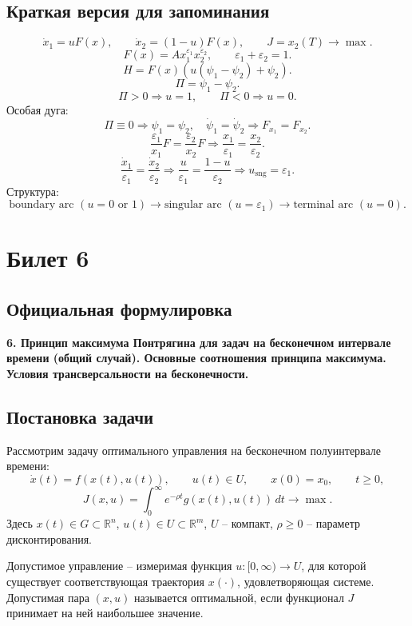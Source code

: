 \documentclass[12pt,a4paper]{article}
\newcommand{\R}{\mathbb{R}}
\newcommand{\eps}{\varepsilon}
\newcommand{\sng}{\mathrm{sng}}
\begin{document}
\subsection{Краткая версия для запоминания}

\[
    \dot x_1=uF(x),
    \qquad
    \dot x_2=(1-u)F(x),
    \qquad
    J=x_2(T)\to\max.
\]
\[
    F(x)=Ax_1^{\eps_1}x_2^{\eps_2},
    \qquad
    \eps_1+\eps_2=1.
\]
\[
    H=F(x)(u(\psi_1-\psi_2)+\psi_2).
\]
\[
    \Pi=\psi_1-\psi_2.
\]
\[
    \Pi>0\Rightarrow u=1,
    \qquad
    \Pi<0\Rightarrow u=0.
\]
Особая дуга:
\[
    \Pi\equiv0\Rightarrow \psi_1=\psi_2,
    \quad
    \dot\psi_1=\dot\psi_2
    \Rightarrow
    F_{x_1}=F_{x_2}.
\]
\[
    \frac{\eps_1}{x_1}F=\frac{\eps_2}{x_2}F
    \Rightarrow
    \frac{x_1}{\eps_1}=\frac{x_2}{\eps_2}.
\]
\[
    \frac{\dot x_1}{\eps_1}=\frac{\dot x_2}{\eps_2}
    \Rightarrow
    \frac{u}{\eps_1}=\frac{1-u}{\eps_2}
    \Rightarrow
    u_{\sng}=\eps_1.
\]
Структура:
\[
    \text{boundary arc }(u=0\text{ or }1)
    \to
    \text{singular arc }(u=\eps_1)
    \to
    \text{terminal arc }(u=0).
\]

\newpage

\section{Билет 6}

\subsection*{Официальная формулировка}

\textbf{6. Принцип максимума Понтрягина для задач на бесконечном интервале времени (общий случай). Основные соотношения принципа максимума. Условия трансверсальности на бесконечности.}

\subsection{Постановка задачи}

Рассмотрим задачу оптимального управления на бесконечном полуинтервале времени:
\[
    \dot x(t)=f(x(t),u(t)),
    \qquad
    u(t)\in U,
    \qquad
    x(0)=x_0,
    \qquad
    t\ge0,
\]
\[
    J(x,u)=\int_0^\infty e^{-\rho t}g(x(t),u(t))\,dt\to\max.
\]
Здесь \(x(t)\in G\subset\R^n\), \(u(t)\in U\subset\R^m\), \(U\) -- компакт, \(\rho\ge0\) -- параметр дисконтирования.

Допустимое управление -- измеримая функция \(u:[0,\infty)\to U\), для которой существует соответствующая траектория \(x(\cdot)\), удовлетворяющая системе. Допустимая пара \((x,u)\) называется оптимальной, если функционал \(J\) принимает на ней наибольшее значение.
\end{document}
